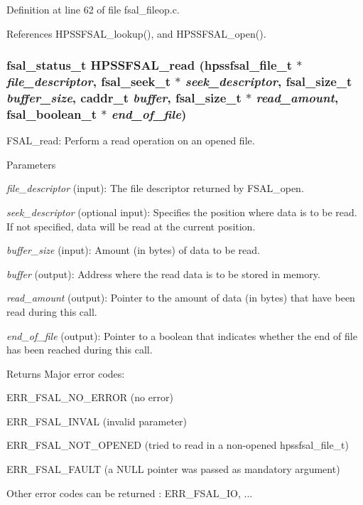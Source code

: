 Definition at line 62 of file fsal\_\-fileop.c.

References HPSSFSAL\_\-lookup(), and HPSSFSAL\_\-open().
\subsubsection[{HPSSFSAL\_\-read}]{\setlength{\rightskip}{0pt plus 5cm}fsal\_\-status\_\-t HPSSFSAL\_\-read (hpssfsal\_\-file\_\-t $\ast$ {\em file\_\-descriptor}, \/  fsal\_\-seek\_\-t $\ast$ {\em seek\_\-descriptor}, \/  fsal\_\-size\_\-t {\em buffer\_\-size}, \/  caddr\_\-t {\em buffer}, \/  fsal\_\-size\_\-t $\ast$ {\em read\_\-amount}, \/  fsal\_\-boolean\_\-t $\ast$ {\em end\_\-of\_\-file})}\label{fsal__fileop_8c_a4ff7c8c0e6069aa1cde76037aa1212e2}
FSAL\_\-read: Perform a read operation on an opened file.


\begin{DoxyParams}{Parameters}
\item[{\em file\_\-descriptor}](input): The file descriptor returned by FSAL\_\-open. \item[{\em seek\_\-descriptor}](optional input): Specifies the position where data is to be read. If not specified, data will be read at the current position. \item[{\em buffer\_\-size}](input): Amount (in bytes) of data to be read. \item[{\em buffer}](output): Address where the read data is to be stored in memory. \item[{\em read\_\-amount}](output): Pointer to the amount of data (in bytes) that have been read during this call. \item[{\em end\_\-of\_\-file}](output): Pointer to a boolean that indicates whether the end of file has been reached during this call.\end{DoxyParams}
\begin{DoxyReturn}{Returns}
Major error codes:
\begin{DoxyItemize}
\item ERR\_\-FSAL\_\-NO\_\-ERROR (no error)
\item ERR\_\-FSAL\_\-INVAL (invalid parameter)
\item ERR\_\-FSAL\_\-NOT\_\-OPENED (tried to read in a non-\/opened hpssfsal\_\-file\_\-t)
\item ERR\_\-FSAL\_\-FAULT (a NULL pointer was passed as mandatory argument)
\item Other error codes can be returned : ERR\_\-FSAL\_\-IO, ... 
\end{DoxyItemize}
\end{DoxyReturn}


